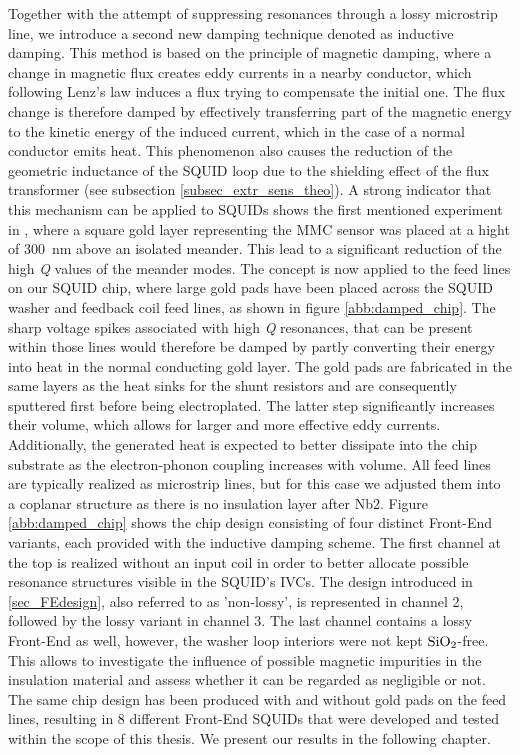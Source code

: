 Together with the attempt of suppressing resonances through a lossy microstrip line, we introduce a second new damping technique denoted as inductive damping. This method is based on the principle of magnetic damping, where a change in magnetic flux creates eddy currents in a nearby conductor, which following Lenz's law induces a flux trying to compensate the initial one. The flux change is therefore damped by effectively transferring part of the magnetic energy to the kinetic energy of the induced current, which in the case of a normal conductor emits heat. This phenomenon also causes the reduction of the geometric inductance of the SQUID loop due to the shielding effect of the flux transformer (see subsection \ref{subsec_extr_sens_theo}). A strong indicator that this mechanism can be applied to SQUIDs shows the first mentioned experiment in \cite{Boyd2022}, where a square gold layer representing the MMC sensor was placed at a hight of \qty{300}{\nano\meter} above an isolated meander. This lead to a significant reduction of the high \textit{Q} values of the meander modes. The concept is now applied to the feed lines on our SQUID chip, where large gold pads have been placed across the SQUID washer and feedback coil feed lines, as shown in figure \ref{abb:damped_chip}. The sharp voltage spikes associated with high \textit{Q} resonances, that can be present within those lines would therefore be damped by partly converting their energy into heat in the normal conducting gold layer. The gold pads are fabricated in the same layers as the heat sinks for the shunt resistors and are consequently sputtered first before being electroplated. The latter step significantly increases their volume, which allows for larger and more effective eddy currents. Additionally, the generated heat is expected to better dissipate into the chip substrate as the electron-phonon coupling increases with volume. All feed lines are typically realized as microstrip lines, but for this case we adjusted them into a coplanar structure as there is no insulation layer after Nb2. Figure \ref{abb:damped_chip} shows the chip design consisting of four distinct Front-End variants, each provided with the inductive damping scheme. The first channel at the top is realized without an input coil in order to better allocate possible resonance structures visible in the SQUID's IVCs. The design introduced in \ref{sec_FEdesign}, also referred to as 'non-lossy', is represented in channel 2, followed by the lossy variant in channel 3. The last channel contains a lossy Front-End as well, however, the washer loop interiors were not kept $\rm SiO_2$-free. This allows to investigate the influence of possible magnetic impurities in the insulation material and assess whether it can be regarded as negligible or not. The same chip design has been produced with and without gold pads on the feed lines, resulting in 8 different Front-End SQUIDs that were developed and tested within the scope of this thesis. We present our results in the following chapter.     

